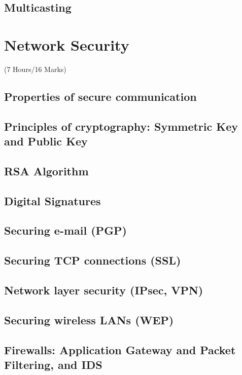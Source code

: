 \documentclass[12pt]{article}
\begin{document}
	\subsection{Multicasting}

	\pagebreak

\section{Network Security}
	\begin{center}(7 Hours/16 Marks)\end{center}
	\subsection{Properties of secure communication}
	\subsection{Principles of cryptography: Symmetric Key and Public Key}
	\subsection{RSA Algorithm}
	\subsection{Digital Signatures}
	\subsection{Securing e-mail (PGP)}
	\subsection{Securing TCP connections (SSL)}
	\subsection{Network layer security (IPsec, VPN)}
	\subsection{Securing wireless LANs (WEP)}
	\subsection{Firewalls: Application Gateway and Packet Filtering, and IDS}
\end{document}
